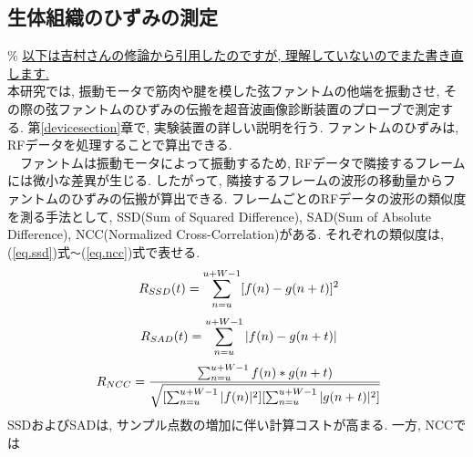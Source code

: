 \subsection{生体組織のひずみの測定}
\% \underline{以下は吉村さんの修論から引用したのですが, 理解していないのでまた書き直します. }\\
本研究では, 振動モータで筋肉や腱を模した弦ファントムの他端を振動させ, その際の弦ファントムのひずみの伝搬を超音波画像診断装置のプローブで測定する. 第\ref{devicesection}章で, 実験装置の詳しい説明を行う. ファントムのひずみは, RFデータを処理することで算出できる. 
\\\ \ ファントムは振動モータによって振動するため, RFデータで隣接するフレームには微小な差異が生じる. したがって, 隣接するフレームの波形の移動量からファントムのひずみの伝搬が算出できる. フレームごとのRFデータの波形の類似度を測る手法として, SSD(Sum of Squared Difference), SAD(Sum of Absolute Difference), NCC(Normalized Cross-Correlation)がある. それぞれの類似度は, (\ref{eq.ssd})式\verb|〜|(\ref{eq.ncc})式で表せる\cite{yoshimurasan}. 
\begin{equation}
\label{eq.ssd}
\\\ R_{SSD} (t) =\sum_{n=u}^{u+W-1} [f(n) - g(n + t)]^2
\end{equation}
\begin{equation}
\label{eq.sad}
\\\  R_{SAD} (t) =\sum_{n=u}^{u+W-1} |f(n) - g(n + t)|
\end{equation}
\begin{equation}
\label{eq.ncc}
\\\ R_{NCC} = \dfrac{\sum_{n=u}^{u+W-1} f(n) * g(n + t)}{\sqrt{[\sum_{n=u}^{u+W-1}|f(n)|^2][\sum_{n=u}^{u+W-1}|g(n+t)|^2]}}
\end{equation}
SSDおよびSADは, サンプル点数の増加に伴い計算コストが高まる. 一方, NCCでは
